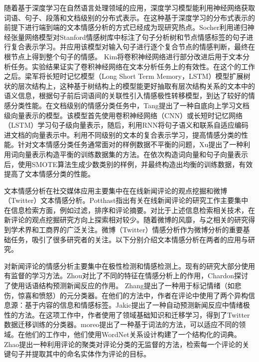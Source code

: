随着基于深度学习在自然语言处理领域的应用，深度学习模型能利用神经网络获取词语、句子、段落和文档级别的分布式表示。在这种基于深度学习的分布式表示的前提下进行端到端的文本情感分析的方式已经成为现研究热点。Socher利用递归神经张量网络模型对Stanford情感树库中标注了句子分析树和节点情感标签的句子进行复合表示学习。并应用该模型对输入句子进行逐个复合节点的情感判断，最终在根节点上得到整个句子的情感。 Kim将卷积神经网络进行部分改进后用于文本分析任务。实验结果证实了卷积神经网络在文本分析任务上的有效性。在这个的工作之后。梁军将长短时记忆模型（Long Short Term Memory，LSTM）模型扩展树状的层次结构上，这种基于树结构上的模型能更好抽取有层次结构关系的文本中的语义信息，根据句子前后词语间的关联性引入情感极性转移模型，到达了较好的情感分类性能。在文档级别的情感分类任务中，Tang提出了一种自底向上学习文档级向量表示的模型。该模型首先使用卷积神经网络（CNN）或长短时记忆网络（LSTM）学习句子级向量表示，随后，利用RNN将句子语义和联系自适应编码进文档的向量表示中。利用不同级别的文本的复合表示学习，提高情感分类的性能。针对文本情感分类任务通常面对的样例数据不平衡的问题，Xu提出了一种利用词向量表示构造平衡的训练数据集的方法。在依次构造词向量和句子向量表示后，使用SMOTE算法生成少数类别的样例，并最终构造出均衡的训练数据，有效提高了文本情感分类的性能。


文本情感分析在社交媒体应用主要集中在在线新闻评论的观点挖掘和微博（Twitter）文本情感分析。Potthast指出有关在线新闻评论的研究工作主要集中在信息检索方面，例如过滤，排序和评论摘要。对比于上述信息检索相关技术，在新评论的观点挖掘研究方向上探索相对较少。随着微博的风靡，与之相关的研究得到学术界和工商界的广泛关注。微博（Twitter）情感分析作为微博分析的重要基础任务，吸引了很多研究者的关注。以下分别介绍文本情感分析在两者的应用与研究。

对新闻评论的情感分析主要集中在极性检测和情感检测上。现有的研究大部分使用有监督的学习方法。Zhou对比了不同的特征在情感分析上的作用，Chardon探讨了使用话语结构预测新闻反应的作用。 Zhang提出了一种用于标记情绪（如悲伤，惊喜和愤怒）的元分类器。在他们的方法中，作者在评论中使用了两个异构信息源：基于内容的信息和情感标签。Jakic提出了一种自动预测新闻反应中情绪极性的方法。在这项工作中，作者使用了领域基础知识和迁移学习，得到了Twitter数据迁移训练的分类器。moreo提出了一种基于词法的方法，可以适应不同的领域。在他们的工作中，他们使用WordNet关系设计构建了一个结构化的词典。 Zhao提出一种利用评论的聚类对评论分类的无监督的方法，检索每一个评论的关键句子并提取其中的命名实体作为评论的目标。

